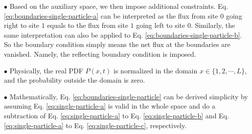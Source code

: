 $\bullet$ Based on the auxiliary space, we then impose additional constraints. Eq. \eqref{eq:boundaries-single-particle-a} can be interpreted as the flux from site $0$ going right to site $1$ equals to the flux from site $1$ going left to site $0$. Similarly, the same interpretation can also be applied to Eq. \eqref{eq:boundaries-single-particle-b}. So the boundary condition simply means the net flux at the boundaries are vanished. Namely, the reflecting boundary condition is imposed. 

$\bullet$ Physically, the real PDF $P(x,t)$ is normalized in the domain $x\in\{1, 2, \cdots, L\}$, and the probability outside the domain is zero.

$\bullet$ Mathematically, Eq. \eqref{eq:boundaries-single-particle} can be derived simplicity by assuming Eq. \eqref{eq:single-particle-a} is valid in the whole space and do a subtraction of Eq. \eqref{eq:single-particle-a} to Eq. \eqref{eq:single-particle-b} and Eq. \eqref{eq:single-particle-a} to Eq. \eqref{eq:single-particle-c}, respectively.  

